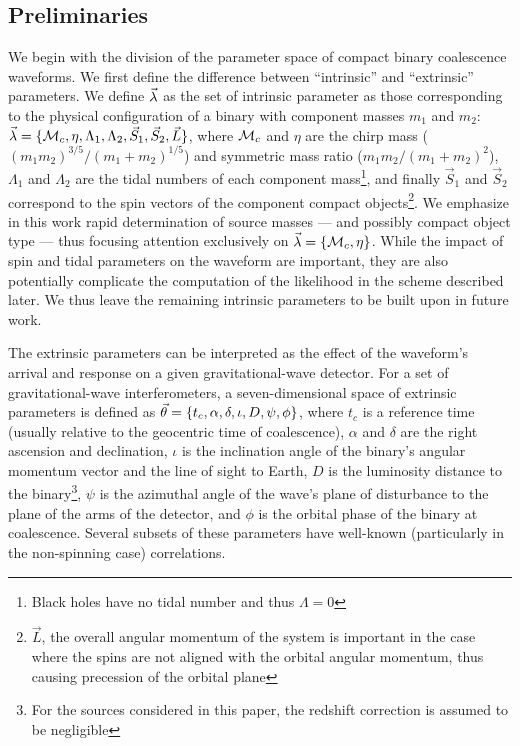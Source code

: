 \subsection{Preliminaries}
We begin with the division of the parameter space of compact binary coalescence waveforms. We first define the difference between ``intrinsic'' and ``extrinsic'' parameters. We define $\vec{\lambda}$ as the set of intrinsic parameter as those corresponding to the physical configuration of a binary with component masses $m_1$ and $m_2$: $\vec{\lambda}=\{{{\cal M}_c},\eta,\Lambda_1,\Lambda_2,\vec{S}_1,\vec{S}_2,\vec{L}\}$, where ${{\cal M}_c}$ and $\eta$ are the chirp mass ($(m_1m_2)^{3/5}/(m_1+m_2)^{1/5}$) and symmetric mass ratio ($m_1m_2/(m_1+m_2)^2$), $\Lambda_1$ and $\Lambda_2$ are the tidal numbers of each component mass\footnote{Black holes have no tidal number and thus $\Lambda=0$}, and finally $\vec{S}_1$ and $\vec{S}_2$ correspond to the spin vectors of the component compact objects\footnote{$\vec{L}$, the overall angular momentum of the system is important in the case where the spins are not aligned with the orbital angular momentum, thus causing precession of the orbital plane}. We emphasize in this work rapid determination of source masses --- and possibly compact object type --- thus focusing attention exclusively on $\vec{\lambda}=\{{{\cal M}_c},\eta\}$. While the impact of spin and tidal parameters on the waveform are important, they are also potentially complicate the computation of the likelihood in the scheme described later. We thus leave the remaining intrinsic parameters to be built upon in future work.

The extrinsic parameters can be interpreted as the effect of the waveform's arrival and response on a given gravitational-wave detector. For a set of gravitational-wave interferometers, a seven-dimensional space of extrinsic parameters is defined as $\vec{\theta}=\{t_c,\alpha,\delta,\iota,D,\psi,\phi\}$, where $t_c$ is a reference time (usually relative to the geocentric time of coalescence), $\alpha$ and $\delta$ are the right ascension and declination, $\iota$ is the inclination angle of the binary's angular momentum vector and the line of sight to Earth, $D$ is the luminosity distance to the binary\footnote{For the sources considered in this paper, the redshift correction is assumed to be negligible}, $\psi$ is the azimuthal angle of the wave's plane of disturbance to the plane of the arms of the detector, and $\phi$ is the orbital phase of the binary at coalescence. Several subsets of these parameters have well-known (particularly in the non-spinning case) correlations.
